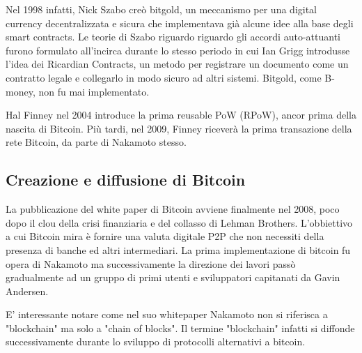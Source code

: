 Nel 1998 infatti, Nick Szabo creò bitgold, un meccanismo per una digital currency decentralizzata e sicura che implementava già alcune idee alla base degli smart contracts. Le teorie di Szabo riguardo riguardo gli accordi auto-attuanti furono formulato all'incirca durante lo stesso periodo in cui Ian Grigg introdusse l'idea dei Ricardian Contracts, un metodo per registrare un documento come un contratto legale e collegarlo in modo sicuro ad altri sistemi. Bitgold, come B-money, non fu mai implementato.
 
 Hal Finney nel 2004 introduce la prima reusable PoW (RPoW), ancor prima della nascita di Bitcoin. Più tardi, nel 2009, Finney riceverà la prima transazione della rete Bitcoin, da parte di Nakamoto stesso. 

\subsection{Creazione e diffusione di Bitcoin}

La pubblicazione del white paper di Bitcoin avviene finalmente nel 2008, poco dopo il clou della crisi finanziaria e del collasso di Lehman Brothers. L'obbiettivo a cui Bitcoin mira è fornire una valuta digitale P2P che non necessiti della presenza di banche ed altri intermediari.  La prima implementazione di bitcoin fu opera di Nakamoto ma successivamente la direzione dei lavori passò gradualmente ad un gruppo di primi utenti e sviluppatori capitanati da Gavin Andersen. 

E' interessante notare come nel suo whitepaper Nakamoto non si riferisca a "blockchain" ma solo a "chain of blocks". Il termine "blockchain" infatti si diffonde successivamente durante lo sviluppo di protocolli alternativi a bitcoin. 

